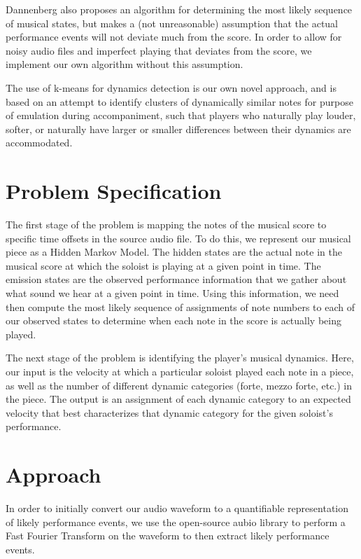 \documentclass[11pt]{article}
\begin{document}
Dannenberg \cite{dannenberg} also proposes an algorithm for determining
the most likely sequence of musical states, but makes a (not unreasonable)
assumption that the actual performance events will not deviate much
from the score. In order to allow for noisy audio files and imperfect
playing that deviates from the score, we implement our own algorithm
without this assumption.

The use of k-means for dynamics detection is our own novel approach,
and is based on an attempt to identify clusters of dynamically
similar notes for purpose of emulation during accompaniment,
such that players who naturally play louder, softer, or naturally
have larger or smaller differences between their dynamics are
accommodated.

\section{Problem Specification}

The first stage of the problem is mapping the notes of the musical
score to specific time offsets in the source audio file.
To do this, we represent our musical piece as a Hidden Markov Model.
The hidden states are the actual note in the musical score at which
the soloist is playing at a given point in time. The emission states
are the observed performance information that we gather about what sound
we hear at a given point in time. Using this information, we need then
compute the most likely sequence of assignments of note numbers to
each of our observed states to determine when each note in the score
is actually being played.

The next stage of the problem is identifying the player's
musical dynamics. Here, our input is the velocity at which a particular
soloist played each note in a piece, as well as the number of different
dynamic categories (forte, mezzo forte, etc.) in the piece. The output
is an assignment of each dynamic category to an expected velocity
that best characterizes that dynamic category for the given soloist's
performance.

\section{Approach}

In order to initially convert our audio waveform to a quantifiable
representation of likely performance events, we use the open-source
aubio library to perform a Fast Fourier Transform on the waveform
to then extract likely performance events.
\end{document}
